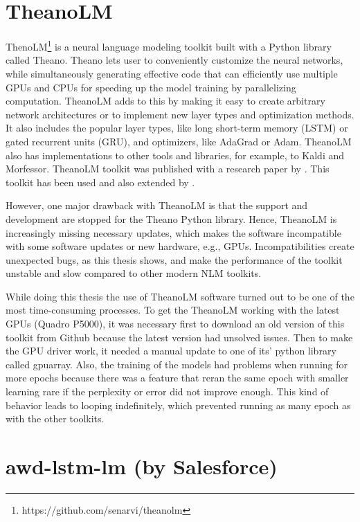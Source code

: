 \section{TheanoLM}

ThenoLM\footnote{https://github.com/senarvi/theanolm} is a neural language modeling toolkit built with a Python library called Theano. Theano lets user to conveniently customize the neural networks, while simultaneously generating effective code that can efficiently use multiple GPUs and CPUs for speeding up the model training by parallelizing computation. TheanoLM adds to this by making it easy to create arbitrary network architectures or to implement new layer types and optimization methods. It also includes the popular layer types, like long short-term memory (LSTM) or gated recurrent units (GRU), and optimizers, like AdaGrad or Adam. TheanoLM also has implementations to other tools and libraries, for example, to Kaldi and Morfessor. TheanoLM toolkit was published with a research paper by \textcite{enarvi2016theanolm}. This toolkit has been used and also extended by \textcite{enarvi2017automatic,smit2017aalto}. 

However, one major drawback with TheanoLM is that the support and development are stopped for the Theano Python library. Hence, TheanoLM is increasingly missing necessary updates, which makes the software incompatible with some software updates or new hardware, e.g., GPUs. Incompatibilities create unexpected bugs, as this thesis shows, and make the performance of the toolkit unstable and slow compared to other modern NLM toolkits.

While doing this thesis the use of TheanoLM software turned out to be one of the most time-consuming processes. To get the TheanoLM working with the latest GPUs (Quadro P5000), it was necessary first to download an old version of this toolkit from Github because the latest version had unsolved issues. Then to make the GPU driver work, it needed a manual update to one of its' python library called gpuarray. Also, the training of the models had problems when running for more epochs because there was a feature that reran the same epoch with smaller learning rare if the perplexity or error did not improve enough. This kind of behavior leads to looping indefinitely, which prevented running as many epoch as with the other toolkits.

\section{awd-lstm-lm (by Salesforce)}


